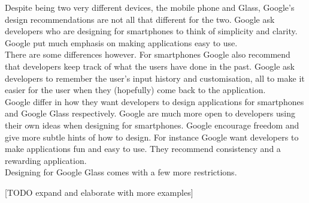 Despite being two very different devices, the mobile phone and Glass, Google's design recommendations are not all that different for the two. Google ask developers who are designing for smartphones to think of simplicity and clarity. Google put much emphasis on making applications easy to use.\\

There are some differences however. For smartphones Google also recommend that developers keep track of what the users have done in the past. Google ask developers to remember the user's input history and customisation, all to make it easier for the user when they (hopefully) come back to the application.\cite{androidDesignPrinciples}\\








Google differ in how they want developers to design applications for smartphones and Google Glass respectively. Google are much more open to developers using their own ideas when designing for smartphones. Google encourage freedom and give more subtle hints of how to design. For instance Google want developers to make applications fun and easy to use. They recommend consistency and a rewarding application.\\

Designing for Google Glass comes with a few more restrictions. 

[TODO expand and elaborate with more examples]








